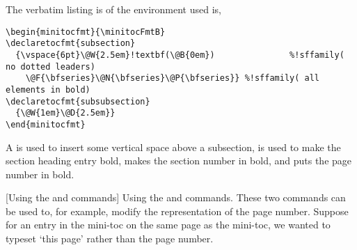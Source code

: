 \documentclass[10pt]{article}
\makeatletter
\renewcommand*{\thesubparagraph}{\texorpdfstring{\protect\P\protect\P}{\textparagraph\textparagraph}}
\renewcommand{\subparagraph}
    {\renewcommand{\@seccntformat}[1]{\thesubparagraph\space}%
    \@startsection{subparagraph}{5}{\parindent}{6pt}{-3pt}{\bfseries}}
\edef\amtIndent{\the\parindent}
\makeatother
\begin{document}
\begin{center}
\begin{minitocfmt}{\minitocFmtB}
  {\vspace{6pt}\@W{2.5em}\@B{0em}\@F{\bfseries}\@N{\bfseries}\@P{\bfseries}}
  {\@W{1em}\@D{2.5em}}
\end{minitocfmt}
\begin{minipage}[c]{.8\linewidth}\vskip-6pt
\minitocFmtB\insertminitoc[CandM]
\end{minipage}
\end{center}
The verbatim listing is of the  environment used is,
\begin{Verbatim}[xleftmargin=\amtIndent,fontsize=\small,commandchars=!()]
\begin{minitocfmt}{\minitocFmtB}
\declaretocfmt{subsection}
  {\vspace{6pt}\@W{2.5em}!textbf(\@B{0em})               %!sffamily( no dotted leaders)
    \@F{\bfseries}\@N{\bfseries}\@P{\bfseries}} %!sffamily( all elements in bold)
\declaretocfmt{subsubsection}
  {\@W{1em}\@D{2.5em}}
\end{minitocfmt}
\end{Verbatim}
A  is used to insert some vertical space above a subsection,  is used to make the
section heading entry bold,   makes the section number in bold, and  puts the page number
in bold.

\subparagraph[Using the
  \texorpdfstring{\protect{} and \protect{}}{\textbackslash{@L}
    and \textbackslash{@Pg}} commands] {Using the  and 
    commands.}\label{spara:LPg} These two commands can be used to, for example, modify the
    representation of the page number. Suppose for an entry in the mini-toc
    on the same page as the mini-toc, we wanted to typeset `this page'
    rather than the page number.
\end{document}
